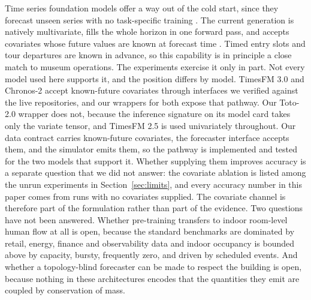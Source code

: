 \documentclass[utf8]{FrontiersinHarvard}
\newif\ifrevisionmarkup
\newcommand{\new}[1]{\ifrevisionmarkup\textcolor{revision}{#1}\else#1\fi}
\newif\ifsecondrevisionmarkup
\newcommand{\rev}[1]{\ifsecondrevisionmarkup\textcolor{revisiontwo}{#1}\else#1\fi}
\theoremstyle{plain}
\theoremstyle{definition}
\theoremstyle{remark}
\begin{document}
Time series foundation models offer a way out of the cold start, since they forecast unseen series with no task-specific training \citep{das2024timesfm,ansari2024chronos,woo2024moirai}. The current generation is natively multivariate, fills the whole horizon in one forward pass, and accepts covariates whose future values are known at forecast time \citep{timesfm3,ansari2025chronos2,khwaja2026toto2}\new{. Timed entry slots and tour departures are known in advance, so this capability is in principle a close match to museum operations. \rev{The experiments exercise it only in part. Not every model used here supports it, and the position differs by model.} TimesFM 3.0 and Chronos-2 accept known-future covariates through interfaces we verified against the live repositories, and our wrappers for both expose that pathway. Our Toto-2.0 wrapper does not, because the inference signature on its model card takes only the variate tensor, and TimesFM 2.5 is used univariately throughout. Our data contract carries known-future covariates, the forecaster interface accepts them, and the simulator emits them, so the pathway is implemented and tested for the two models that support it. Whether supplying them improves accuracy is a separate question that we did not answer: the covariate ablation is listed among the unrun experiments in Section~\ref{sec:limits}, and every accuracy number in this paper comes from runs with no covariates supplied. The covariate channel is therefore part of the formulation rather than part of the evidence}. Two questions have not been answered. Whether pre-training transfers to indoor room-level human flow at all is open, because the standard benchmarks are dominated by retail, energy, finance and observability data \citep{aksu2024gifteval} and indoor occupancy is bounded above by capacity, bursty, frequently zero, and driven by scheduled events. And whether a topology-blind forecaster can be made to respect the building is open, because nothing in these architectures encodes that the quantities they emit are coupled by conservation of mass.
\end{document}
